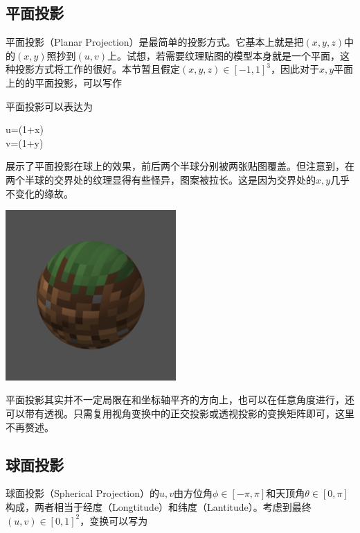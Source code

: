 \subsection{平面投影}
平面投影（Planar Projection）是最简单的投影方式。它基本上就是把$(x,y,z)$中的$(x,y)$照抄到$(u,v)$上。试想，若需要纹理贴图的模型本身就是一个平面，这种投影方式将工作的很好。本节暂且假定$(x,y,z)\in[-1,1]^3$，因此对于$x,y$平面上的的平面投影，可以写作
\begin{BoxFormula}[平面投影]
    平面投影可以表达为
    \begin{Gather}[6pt]
        u=(1+x)\\
        v=(1+y)
    \end{Gather}
\end{BoxFormula}

展示了平面投影在球上的效果，前后两个半球分别被两张贴图覆盖。但注意到，在两个半球的交界处的纹理显得有些怪异，图案被拉长。这是因为交界处的$x,y$几乎不变化的缘故。
\begin{Figure}[平面投影]
    \includegraphics[width=6.5cm]{image/RasterizationIOW/TexPlaner.png}
\end{Figure}

平面投影其实并不一定局限在和坐标轴平齐的方向上，也可以在任意角度进行，还可以带有透视。只需复用视角变换中的正交投影或透视投影的变换矩阵即可，这里不再赘述。

\subsection{球面投影}
球面投影（Spherical Projection）的$u,v$由方位角$\phi\in[-\pi,\pi]$和天顶角$\theta\in[0,\pi]$构成，两者相当于经度（Longtitude）和纬度（Lantitude）。考虑到最终$(u,v)\in[0,1]^2$，变换可以写为
\begin{BoxFormula}[球面投影]
\end{BoxFormula}

